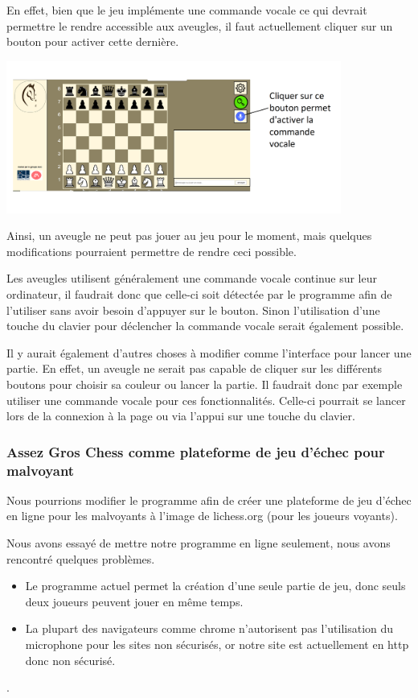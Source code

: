\documentclass[12pt, openany]{report}
\begin{document}
En effet, bien que le jeu implémente une commande vocale ce qui devrait permettre le rendre accessible aux aveugles, il faut actuellement cliquer sur un bouton pour activer cette dernière.

\includegraphics[width=11cm]{src/image9.png}

Ainsi, un aveugle ne peut pas jouer au jeu pour le moment, mais quelques modifications pourraient permettre de rendre ceci possible.


Les aveugles utilisent généralement une commande vocale continue sur leur ordinateur, il faudrait donc que celle-ci soit détectée par le programme afin de l'utiliser sans avoir besoin d'appuyer sur le bouton.
Sinon l'utilisation d'une touche du clavier pour déclencher la commande vocale serait également possible.

Il y aurait également d'autres choses à modifier comme l'interface pour lancer une partie. En effet, un aveugle ne serait pas capable de cliquer sur les différents boutons pour choisir sa couleur ou lancer la partie. Il faudrait donc par exemple utiliser une commande vocale pour ces fonctionnalités. Celle-ci pourrait se lancer lors de la connexion à la page ou via l'appui sur une touche du clavier.

\subsubsection{Assez Gros Chess comme plateforme de jeu d'échec pour malvoyant}

Nous pourrions modifier le programme afin de créer une plateforme de jeu d'échec en ligne pour les malvoyants à l'image de lichess.org (pour les joueurs voyants).

Nous avons essayé de mettre notre programme en ligne seulement, nous avons rencontré quelques problèmes.
\begin{itemize}
    \item Le programme actuel permet la création d'une seule partie de jeu, donc seuls deux joueurs peuvent jouer en même temps.
    \item La plupart des navigateurs comme chrome n'autorisent pas l'utilisation du microphone pour les sites non sécurisés, or notre site est actuellement en http donc non sécurisé.
\end{itemize}.
\end{document}
